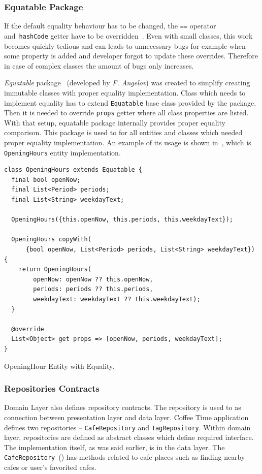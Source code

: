 \subsubsection{Equatable Package}
If the default equality behaviour has to be changed, the \verb|==| operator and~\verb|hashCode| getter have to be overridden~\cite{dart-equality}.
Even with small classes, this work becomes quickly tedious and can leads to unnecessary bugs for example when some property is added and developer forgot to update these overrides. Therefore in case of complex classes the amount of bugs only increases. 

\textit{Equatable} package~\cite{package-equatable} (developed by \textit{F. Angelov}) was created to simplify creating immutable classes with proper equality implementation. Class which needs to implement equality has to extend \verb|Equatable| base class provided by the package. Then it is needed to override \verb|props| getter where all class properties are listed. With that setup, equatable package internally provides proper equality comparison. This package is used to for all entities and classes which needed proper equality implementation. An example of its usage is shown in~, which is \verb|OpeningHours| entity implementation. 

\begin{listing}[ht]
\begin{verbatim}
class OpeningHours extends Equatable {
  final bool openNow;
  final List<Period> periods;
  final List<String> weekdayText;

  OpeningHours({this.openNow, this.periods, this.weekdayText});

  OpeningHours copyWith(
      {bool openNow, List<Period> periods, List<String> weekdayText}) {
    return OpeningHours(
        openNow: openNow ?? this.openNow,
        periods: periods ?? this.periods,
        weekdayText: weekdayText ?? this.weekdayText);
  }

  @override
  List<Object> get props => [openNow, periods, weekdayText];
}
\end{verbatim}
\caption{OpeningHour Entity with Equality.}
\label{listing:ct-opening-hour-entity}
\end{listing}

\subsubsection{Repositories Contracts}
Domain Layer also defines repository contracts. The repository is used to as connection between presentation layer and data layer. Coffee Time application defines two repositories -- \verb|CafeRepository| and \verb|TagRepository|. Within domain layer, repositories are defined as abstract classes which define required interface. The implementation itself, as was said earlier, is in the data layer. The \verb|CafeRepository|~() has methods related to cafe places such as finding nearby cafes or user's favorited cafes. 

